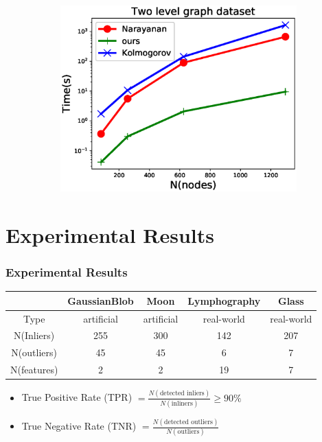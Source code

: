 \documentclass[notheorems]{beamer}
\begin{document}
\begin{frame}
\begin{figure}
\begin{subfigure}{0.4\textwidth}
	\end{subfigure}~
	\begin{subfigure}{0.4\textwidth}
		\includegraphics[width=\textwidth]{pic/time_complexity_two_level.eps}
	\end{subfigure}
\end{figure} 
\end{frame}
\section{Experimental Results}
\begin{frame}
	\frametitle{Experimental Results}
\begin{table}
\centering
\begin{tabular}{ccccc}
\hline
              &  GaussianBlob   &      Moon       &  Lymphography  &     Glass     \\
\hline
   Type    & artificial & artificial & real-world & real-world \\
   N(Inliers) & 255  & 300 & 142  & 207 \\
   N(outliers)   & 45 &  45  & 6 & 7 \\
   N(features)   & 2 &  2  & 19 & 7  \\
\hline
\end{tabular}
\end{table}
\begin{itemize}
\item True Positive Rate (TPR)  $=\frac{N(\textrm{detected inliers})}{N(\textrm{inliners})} \geq 90\% $
\item True Negative Rate (TNR) $=\frac{N(\textrm{detected outliers})}{N(\textrm{outliers})}$
\end{itemize}
\begin{table}
\centering
{\scriptsize

}
\end{table}

\end{frame}	
\end{document}
